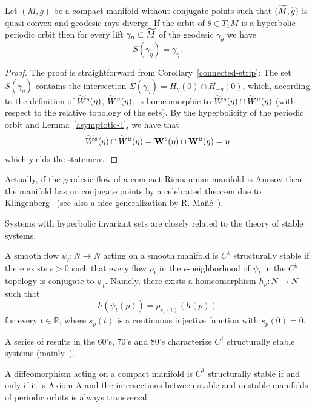 \documentclass[AHL,Unicode,longabstracts,published]{cedram}
\newcommand{\bfW}{\mathbf{W}}
\newcommand{\bbR}{\mathbb{R}}
\let\oldtilde\tilde
\renewcommand*{\tilde}[1]{\mathchoice{\widetilde{#1}}{\widetilde{#1}}{\oldtilde{#1}}{\oldtilde{#1}}}
\begin{document}
\begin{lemm}\label{hyperbolic-no-strip}
Let $(M,g)$ be a compact manifold without conjugate points such that $(\tilde{M}, \tilde{g})$ is quasi-convex and geodesic rays diverge. If the orbit of $\theta \in T_{1}M$ is a hyperbolic periodic orbit then for every lift $\gamma_{\eta} \subset \tilde{M}$ of the geodesic $\gamma_{\theta}$ we have
\[
S(\gamma_{\eta}) = \gamma_{\eta}.
\]
\end{lemm}

\begin{proof}
The proof is straightforward from Corollary~\ref{connected-strip}: The set $S(\gamma_{\eta})$ contains the intersection $\Sigma(\gamma_{\eta}) = H_{\eta}(0) \cap H_{-\eta}(0)$, which, according to the definition of $\tilde{W}^{s}(\eta)$, $\tilde{W}^{u}(\eta)$, is homeomorphic to $\tilde{W}^{s}(\eta) \cap \tilde{W}^{u}(\eta)$ (with respect to the relative topology of the sets). By the hyperbolicity of the periodic orbit and Lemma~\ref{asymptotic-1}, we have that
\[
\tilde{W}^{s}(\eta) \cap \tilde{W}^{u}(\eta) = \bfW^{s}(\eta) \cap \bfW^{u}(\eta) = \eta
\]
which yields the statement.
\end{proof}


Actually, if the geodesic flow of a compact Riemannian manifold is Anosov then the manifold has no conjugate points by a celebrated theorem due to Klingenberg~\cite{kn:Klingenberg} (see also a nice generalization by R. Mañé~\cite{kn:Mane2}).

Systems with hyperbolic invariant sets are closely related to the theory of stable systems.

\begin{defi}\label{Ck-stability}
A smooth flow $\psi_{t} : N\longrightarrow N$ acting on a smooth manifold is $C^{k}$ structurally stable if there exists $\epsilon >0$ such that every flow $\rho_{t}$ in the $\epsilon$-neighborhood of $\psi_{t}$ in the $C^{k}$ topology is conjugate to $\psi_{t}$. Namely, there exists a homeomorphism $h_{\rho}: N\longrightarrow N$ such that
\[
h(\psi_{t}(p)) = \rho_{s_{p}(t)}(h(p))
\]
for every $t \in \bbR$, where $s_{p}(t)$ is a continuous injective function with $s_{p}(0) =0$.
\end{defi}

A series of results in the 60's, 70's and 80's characterize $C^{1}$ structurally stable systems (mainly~\cite{kn:Mane,kn:Mane88,kn:Robin-Robinson,kn:Robin-Robinson2}).

\begin{theo}\label{stab-diffeo}
A diffeomorphism acting on a compact manifold is $C^{1}$ structurally stable if and only if it is Axiom A and the intersections between stable and unstable manifolds of periodic orbits is always transversal.
\end{theo}
\end{document}
